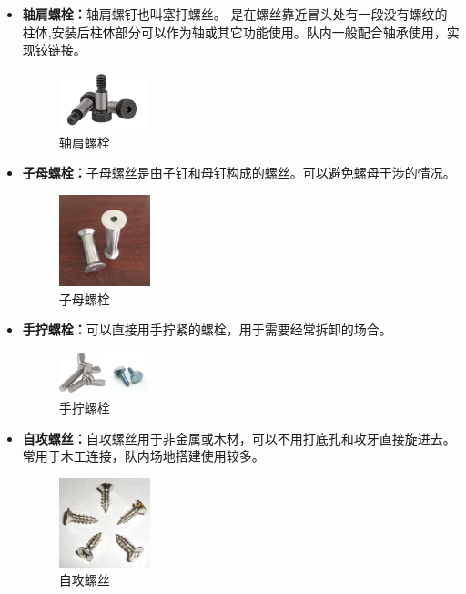 \documentclass[UTF8]{article} %
\begin{document}
\begin{itemize}
  \item \textbf{轴肩螺栓：}轴肩螺钉也叫塞打螺丝。 是在螺丝靠近冒头处有一段没有螺纹的柱体,安装后柱体部分可以作为轴或其它功能使用。队内一般配合轴承使用，实现铰链接。
  
  \begin{figure}[h]
    \centering
    \includegraphics[width=0.25\textwidth]{luo3.png}
    \caption{轴肩螺栓}
  \end{figure}

  \item \textbf{子母螺栓：}子母螺丝是由子钉和母钉构成的螺丝。可以避免螺母干涉的情况。
  
  \begin{figure}[h]
    \centering
    \includegraphics[width=0.25\textwidth]{luo4.png}
    \caption{子母螺栓}
  \end{figure}

  \item \textbf{手拧螺栓：}可以直接用手拧紧的螺栓，用于需要经常拆卸的场合。
  
  \begin{figure}[h]
    \centering
    \includegraphics[width=0.25\textwidth]{luo5.png}
    \caption{手拧螺栓}
  \end{figure}

  \item \textbf{自攻螺丝：}自攻螺丝用于非金属或木材，可以不用打底孔和攻牙直接旋进去。常用于木工连接，队内场地搭建使用较多。
  
  \begin{figure}[h]
    \centering
    \includegraphics[width=0.25\textwidth]{luo6.png}
    \caption{自攻螺丝}
  \end{figure}

\end{itemize}
\end{document}
